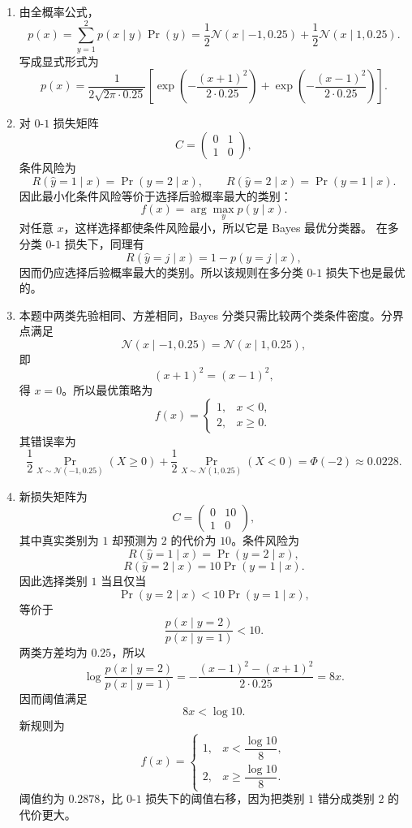 \documentclass[UTF8,a4paper,12pt]{ctexart}
\newcommand{\Prb}{\operatorname{Pr}}
\newcommand{\Normal}{\mathcal{N}}
\begin{document}
\begin{enumerate}
  \item 由全概率公式，
  \[
      p(x)=\sum_{y=1}^2p(x\mid y)\Prb(y)
      =\frac{1}{2}\Normal(x\mid -1,0.25)
       +\frac{1}{2}\Normal(x\mid 1,0.25).
  \]
  写成显式形式为
  \[
      p(x)=\frac{1}{2\sqrt{2\pi\cdot0.25}}
      \left[
      \exp\!\left(-\frac{(x+1)^2}{2\cdot0.25}\right)
      +
      \exp\!\left(-\frac{(x-1)^2}{2\cdot0.25}\right)
      \right].
  \]

  \item 对 $0$-$1$ 损失矩阵
  \[
      C=\begin{pmatrix}0&1\\1&0\end{pmatrix},
  \]
  条件风险为
  \[
      R(\hat y=1\mid x)=\Prb(y=2\mid x),\qquad
      R(\hat y=2\mid x)=\Prb(y=1\mid x).
  \]
  因此最小化条件风险等价于选择后验概率最大的类别：
  \[
      f(x)=\arg\max_y p(y\mid x).
  \]
  对任意 $x$，这样选择都使条件风险最小，所以它是 Bayes 最优分类器。
  在多分类 $0$-$1$ 损失下，同理有
  \[
      R(\hat y=j\mid x)=1-p(y=j\mid x),
  \]
  因而仍应选择后验概率最大的类别。所以该规则在多分类 $0$-$1$ 损失下也是最优的。

  \item 本题中两类先验相同、方差相同，Bayes 分类只需比较两个类条件密度。分界点满足
  \[
      \Normal(x\mid -1,0.25)=\Normal(x\mid 1,0.25),
  \]
  即
  \[
      (x+1)^2=(x-1)^2,
  \]
  得 $x=0$。所以最优策略为
  \[
      f(x)=
      \begin{cases}
      1, & x<0,\\
      2, & x\ge 0.
      \end{cases}
  \]
  其错误率为
  \[
      \frac{1}{2}\Prb_{X\sim\Normal(-1,0.25)}(X\ge0)
      +\frac{1}{2}\Prb_{X\sim\Normal(1,0.25)}(X<0)
      =\Phi(-2)\approx 0.0228.
  \]

  \item 新损失矩阵为
  \[
      C=\begin{pmatrix}0&10\\1&0\end{pmatrix},
  \]
  其中真实类别为 $1$ 却预测为 $2$ 的代价为 $10$。条件风险为
  \[
      R(\hat y=1\mid x)=\Prb(y=2\mid x),
  \]
  \[
      R(\hat y=2\mid x)=10\Prb(y=1\mid x).
  \]
  因此选择类别 $1$ 当且仅当
  \[
      \Prb(y=2\mid x)<10\Prb(y=1\mid x),
  \]
  等价于
  \[
      \frac{p(x\mid y=2)}{p(x\mid y=1)}<10.
  \]
  两类方差均为 $0.25$，所以
  \[
      \log\frac{p(x\mid y=2)}{p(x\mid y=1)}
      =-\frac{(x-1)^2-(x+1)^2}{2\cdot0.25}
      =8x.
  \]
  因而阈值满足
  \[
      8x<\log 10.
  \]
  新规则为
  \[
      f(x)=
      \begin{cases}
      1, & x<\dfrac{\log 10}{8},\\[4pt]
      2, & x\ge \dfrac{\log 10}{8}.
      \end{cases}
  \]
  阈值约为 $0.2878$，比 $0$-$1$ 损失下的阈值右移，因为把类别 $1$ 错分成类别 $2$ 的代价更大。
\end{enumerate}
\end{document}
